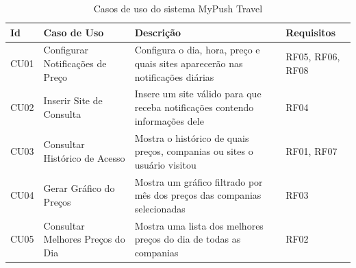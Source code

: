 \begin{table}[H]
	\centering
	\begin{tabular}{p{3cm}|p{4cm}|p{4cm}|p{3cm}}
		\toprule
			\textbf{Id} & \textbf{Caso de Uso} & \textbf{Descrição} & \textbf{Requisitos} \\ \hline
		\midrule
			CU01 & Configurar Notificações de Preço & Configura o dia, hora, preço e quais sites aparecerão nas notificações diárias & RF05, RF06, RF08 \\ \hline
			CU02 & Inserir Site de Consulta & Insere um site válido para que receba notificações contendo informações dele & RF04 \\ \hline
			CU03 & Consultar Histórico de Acesso & Mostra o histórico de quais preços, companias ou sites o usuário visitou & RF01, RF07 \\ \hline
			CU04 & Gerar Gráfico do Preços & Mostra um gráfico filtrado por mês dos preços das companias selecionadas & RF03 \\ \hline
			CU05 & Consultar Melhores Preços do Dia & Mostra uma lista dos melhores preços do dia de todas as companias & RF02 \\ \hline
		\bottomrule
	\end{tabular}
	\caption{Casos de uso do sistema MyPush Travel}
	\label{tab03}
\end{table}